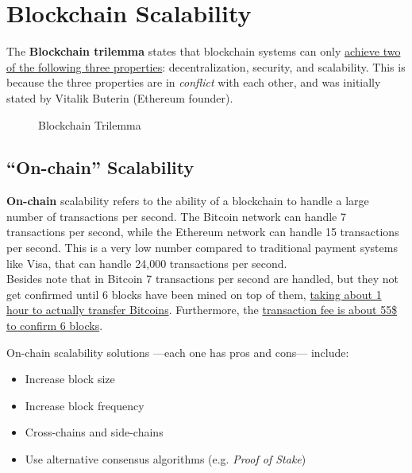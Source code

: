 \chapter{Blockchain Scalability}
The \textbf{Blockchain trilemma} states that blockchain systems can only \ul{achieve two of the following three properties}: decentralization, security, and scalability. This is because the three properties are in \textit{conflict} with each other, and was initially stated by Vitalik Buterin (Ethereum founder).

\begin{figure}[htbp]
   \centering
  \caption{Blockchain Trilemma}
   \label{fig:blockchain_trilemma}
\end{figure}

\section{``On-chain'' Scalability}
\textbf{On-chain} scalability refers to the ability of a blockchain to handle a large number of transactions per second. The Bitcoin network can handle 7 transactions per second, while the Ethereum network can handle 15 transactions per second. This is a very low number compared to traditional payment systems like Visa, that can handle 24,000 transactions per second.\\
Besides note that in Bitcoin 7 transactions per second are handled, but they not get confirmed until 6 blocks have been mined on top of them, \ul{taking about 1 hour to actually transfer Bitcoins}.
Furthermore, the \ul{transaction fee is about 55\$ to confirm 6 blocks}.

On-chain scalability solutions ---each one has pros and cons--- include:
\begin{itemize}
   \item Increase block size
   \item Increase block frequency
   \item Cross-chains and side-chains 
   \item Use alternative consensus algorithms (e.g. \textit{Proof of Stake})
\end{itemize}

